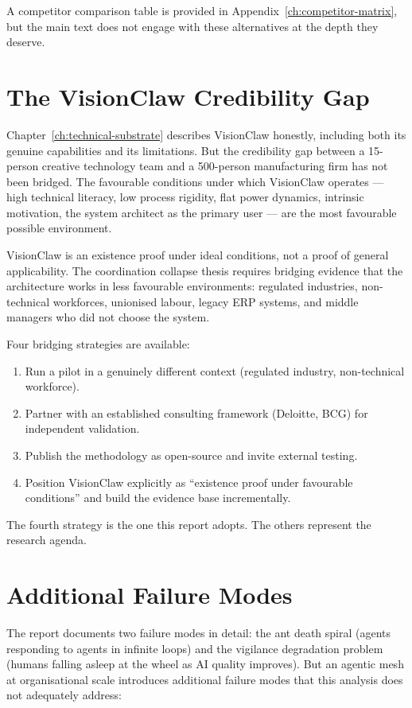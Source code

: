 A competitor comparison table is provided in Appendix~\ref{ch:competitor-matrix}, but the main text does not engage with these alternatives at the depth they deserve.

\section{The VisionClaw Credibility Gap}

Chapter~\ref{ch:technical-substrate} describes VisionClaw honestly, including both its genuine capabilities and its limitations. But the credibility gap between a 15-person creative technology team and a 500-person manufacturing firm has not been bridged. The favourable conditions under which VisionClaw operates --- high technical literacy, low process rigidity, flat power dynamics, intrinsic motivation, the system architect as the primary user --- are the most favourable possible environment.

\begin{keyinsight}
VisionClaw is an existence proof under ideal conditions, not a proof of general applicability. The coordination collapse thesis requires bridging evidence that the architecture works in less favourable environments: regulated industries, non-technical workforces, unionised labour, legacy ERP systems, and middle managers who did not choose the system.

Four bridging strategies are available:
\begin{enumerate}
  \item Run a pilot in a genuinely different context (regulated industry, non-technical workforce).
  \item Partner with an established consulting framework (Deloitte, BCG) for independent validation.
  \item Publish the methodology as open-source and invite external testing.
  \item Position VisionClaw explicitly as ``existence proof under favourable conditions'' and build the evidence base incrementally.
\end{enumerate}
The fourth strategy is the one this report adopts. The others represent the research agenda.
\end{keyinsight}

\section{Additional Failure Modes}

The report documents two failure modes in detail: the ant death spiral (agents responding to agents in infinite loops) and the vigilance degradation problem (humans falling asleep at the wheel as AI quality improves). But an agentic mesh at organisational scale introduces additional failure modes that this analysis does not adequately address:

